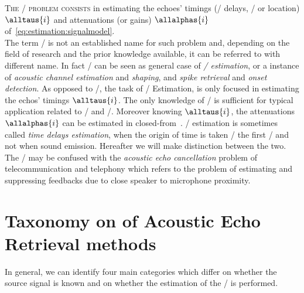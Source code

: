 \mynewline
\textsc{The \AERdef/ problem consists} in estimating the echoes' timings (\aka/ delays, \TOAdef/ or location) $\alltaus{i}$ and attenuations (or gains) $\allalphas{i}$ of~\cref{eq:estimation:signalmodel}.
\\The term \AER/ is not an established name for such problem and, depending on the field of research and the prior knowledge available, it can be referred to with different name.
In fact \AER/ can be seen as general case of \textit{\TOAs/ estimation}, or a instance of \textit{acoustic channel estimation} and \textit{shaping}, and \textit{spike retrieval} and \textit{onset detection}.
As opposed to \AER/, the task of \TOAs/ Estimation, is only focused in estimating the echos' timings $\alltaus{i}$.
The only knowledge of \TOAs/ is sufficient for typical application related to \SSL/ and \RooGE/.
Moreover knowing $\alltaus{i}$, the attenuations $\allalphas{i}$ can be estimated in closed-from~.
\TOAs/ estimation is sometimes called \textit{time delays estimation}, when the origin of time is taken \wrt/ the first \TOA/ and not when sound emission.
Hereafter we will make distinction between the two.
The \AER/ may be confused with the \textit{acoustic echo cancellation} problem of telecommunication and telephony which refers to the problem of estimating and suppressing feedbacks due to close speaker to microphone proximity.

\section{Taxonomy on of Acoustic Echo Retrieval methods}\label{sec:estimation:taxonomy}

In general, we can identify four main categories which differ on whether the source signal is known and on whether the estimation of the \RIR/ is performed.

